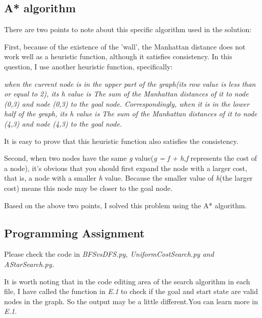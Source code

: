 \documentclass[aps,letterpaper,10pt]{revtex4}
\begin{document}
\subsection{A* algorithm}

\vspace{3mm}


There are two points to note about this specific algorithm used in the solution:

First, because of the existence of the 'wall', the Manhattan distance does not work well as a heuristic function, although it satisfies consistency. 
In this question, I use another heuristic function, specifically: 

\vspace{1mm}
\emph{
when the current node is in the upper part of the graph(its row value is less than or equal to 2), 
its \emph{h} value is The sum of the Manhattan distances of it to node (0,3) and node (0,3) to the goal node. 
Correspondingly, when it is in the lower half of the graph, its \emph{h} value is The sum of the Manhattan distances of it to node (4,3) and node (4,3) to the goal node. }
\vspace{1mm}

It is easy to prove that this heuristic function also satisfies the consistency.
\vspace{2mm}

Second, when two nodes have the same \emph{g} value(\emph{g = f + h,f} represents the cost of a node),
it's obvious that you should first expand the node with a larger cost, that is, a node with a smaller \emph{h} value. 
Because the smaller value of \emph{h}(the larger cost) means this node may be closer to the goal node.

\vspace{3mm}
Based on the above two points, I solved this problem using the A* algorithm.

\newpage
\subsection{Programming Assignment}

Please check the code in \emph{BFSvsDFS.py, UniformCostSearch.py \emph{and} AStarSearch.py.}

It is worth noting that in the code editing area of the search algorithm in each file, 
I have called the function in \emph{E.1} to check if the goal and start state are valid nodes in the graph.
So the output may be a little different.You can learn more in \emph{E.1}.
\end{document}
